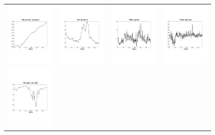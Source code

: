 \documentclass[11pt]{article}
\theoremstyle{definition}
\begin{document}
\begin{figure}[h!]
\begin{center}
\begin{tabular}{cccc}
\includegraphics[trim=2.5cm 8cm 3cm 5cm,width=0.22\columnwidth]{201110_1day_B1.pdf} &
\includegraphics[trim=2.5cm 8cm 3cm 5cm,width=0.22\columnwidth]{201110_1day_B3.pdf} &
\includegraphics[trim=2.5cm 8cm 3cm 5cm,width=0.22\columnwidth]{201110_1day_B5.pdf} & 
\includegraphics[trim=2.5cm 8cm 3cm 5cm,width=0.22\columnwidth]{201110_1day_B7.pdf} \\
\includegraphics[trim=2.5cm 8cm 3cm 5cm,width=0.22\columnwidth]{201110_1day_B2.pdf} & 

\end{tabular}
\end{center}
\end{figure}
\end{document}
